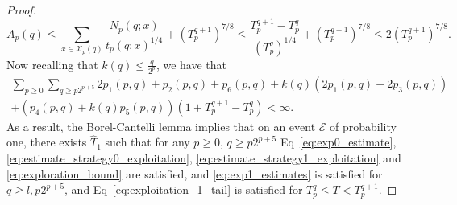 \documentclass[aos]{imsart}
\theoremstyle{plain}
\theoremstyle{remark}
\newcommand{\Ecal}{\mathcal{E}}
\newcommand{\Xcal}{\mathcal{X}}
\newcommand{\1}{\mathbbm{1}}%
\begin{document}
\begin{proof}
\begin{equation}\label{eq:exploration_bound}
    A_p(q) \leq \sum_{x\in\Xcal_p(q)} \frac{N_p(q;x)}{t_p(q;x)^{1/4}} + (T_p^{q+1})^{7/8}
    \leq \frac{T_p^{q+1}-T_p^q}{(T_p^q)^{1/4}} + (T_p^{q+1})^{7/8}
    \leq 2(T_p^{q+1})^{7/8}.
\end{equation}
Now recalling that $k(q)\leq \frac{q}{2^p}$, we have that
\begin{multline*}
    \sum_{p\geq 0} \sum_{q\geq p2^{p+5}} 2p_1(p,q)+p_2(p,q) +p_6(p,q)+ k(q) (2p_1(p,q)+2p_3(p,q))  \\
    +(p_4(p,q)+k(q)p_5(p,q))(1+T_p^{q+1}-T_p^q)<\infty.
\end{multline*}
As a result, the Borel-Cantelli lemma implies that on an event $\Ecal$ of probability one, there exists $\hat T_1$ such that for any $p\geq 0$, $q\geq p2^{p+5}$ Eq~\eqref{eq:exp0_estimate}, \eqref{eq:estimate_strategy0_exploitation}, \eqref{eq:estimate_strategy1_exploitation} and \eqref{eq:exploration_bound} are satisfied, and \eqref{eq:exp1_estimates} is satisfied for $q\geq l,p2^{p+5}$, and Eq~\eqref{eq:exploitation_1_tail} is satisfied for $T_p^q\leq T<T_p^{q+1}$.


\end{proof}
\end{document}
